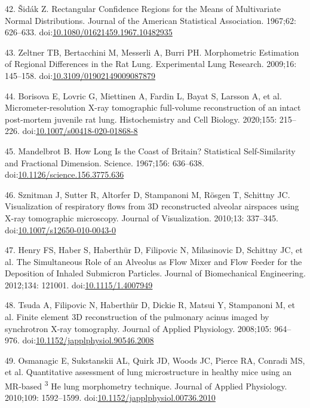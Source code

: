 \documentclass[
  american,
]{article}
\newenvironment{cslreferences}%
  {}%
  {\par}
\begin{document}
\begin{cslreferences}
\leavevmode\hypertarget{ref-GtCynqsI}{}%
42. Šidák Z. Rectangular Confidence Regions for the Means of Multivariate Normal Distributions. Journal of the American Statistical Association. 1967;62: 626--633. doi:\href{https://doi.org/10.1080/01621459.1967.10482935}{10.1080/01621459.1967.10482935}

\leavevmode\hypertarget{ref-I9TmP6IU}{}%
43. Zeltner TB, Bertacchini M, Messerli A, Burri PH. Morphometric Estimation of Regional Differences in the Rat Lung. Experimental Lung Research. 2009;16: 145--158. doi:\href{https://doi.org/10.3109/01902149009087879}{10.3109/01902149009087879}

\leavevmode\hypertarget{ref-Zv1XcgAO}{}%
44. Borisova E, Lovric G, Miettinen A, Fardin L, Bayat S, Larsson A, et al. Micrometer-resolution X-ray tomographic full-volume reconstruction of an intact post-mortem juvenile rat lung. Histochemistry and Cell Biology. 2020;155: 215--226. doi:\href{https://doi.org/10.1007/s00418-020-01868-8}{10.1007/s00418-020-01868-8}

\leavevmode\hypertarget{ref-AdXhaEV4}{}%
45. Mandelbrot B. How Long Is the Coast of Britain? Statistical Self-Similarity and Fractional Dimension. Science. 1967;156: 636--638. doi:\href{https://doi.org/10.1126/science.156.3775.636}{10.1126/science.156.3775.636}

\leavevmode\hypertarget{ref-eioib1TQ}{}%
46. Sznitman J, Sutter R, Altorfer D, Stampanoni M, Rösgen T, Schittny JC. Visualization of respiratory flows from 3D reconstructed alveolar airspaces using X-ray tomographic microscopy. Journal of Visualization. 2010;13: 337--345. doi:\href{https://doi.org/10.1007/s12650-010-0043-0}{10.1007/s12650-010-0043-0}

\leavevmode\hypertarget{ref-1HOyVjqpM}{}%
47. Henry FS, Haber S, Haberthür D, Filipovic N, Milasinovic D, Schittny JC, et al. The Simultaneous Role of an Alveolus as Flow Mixer and Flow Feeder for the Deposition of Inhaled Submicron Particles. Journal of Biomechanical Engineering. 2012;134: 121001. doi:\href{https://doi.org/10.1115/1.4007949}{10.1115/1.4007949}

\leavevmode\hypertarget{ref-OT4s1CSX}{}%
48. Tsuda A, Filipovic N, Haberthür D, Dickie R, Matsui Y, Stampanoni M, et al. Finite element 3D reconstruction of the pulmonary acinus imaged by synchrotron X-ray tomography. Journal of Applied Physiology. 2008;105: 964--976. doi:\href{https://doi.org/10.1152/japplphysiol.90546.2008}{10.1152/japplphysiol.90546.2008}

\leavevmode\hypertarget{ref-LzalnLBH}{}%
49. Osmanagic E, Sukstanskii AL, Quirk JD, Woods JC, Pierce RA, Conradi MS, et al. Quantitative assessment of lung microstructure in healthy mice using an MR-based \textsuperscript{3} He lung morphometry technique. Journal of Applied Physiology. 2010;109: 1592--1599. doi:\href{https://doi.org/10.1152/japplphysiol.00736.2010}{10.1152/japplphysiol.00736.2010}


\end{cslreferences}
\end{document}
